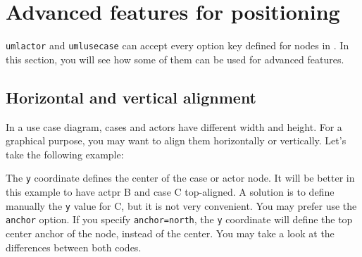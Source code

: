 \documentclass[a4paper,11pt]{report}
\begin{document}
\medskip\section{Advanced features for positioning}\label{s.ucdiagadvfeat}

{\tt umlactor} and {\tt umlusecase} can accept every option key defined for nodes in \TikZ.
In this section, you will see how some of them can be used for advanced features.

\subsection{Horizontal and vertical alignment}\label{ss.ucdiaghvalign}

In a use case diagram, cases and actors have different width and height. For a graphical purpose, you may want to align them horizontally or vertically. Let's take the following example:

\medskip

\begin{minipage}{0.5\textwidth}

\end{minipage}
\begin{minipage}{0.5\textwidth}
\begin{center}
\end{center}
\end{minipage}

\medskip

The {\tt y} coordinate defines the center of the case or actor node. It will be better in this example to have actpr B and case C top-aligned. A solution is to define manually the {\tt y} value for C, but it is not very convenient. You may prefer use the {\tt anchor} option. If you specify {\tt anchor=north}, the {\tt y} coordinate will define the top center anchor of the node, instead of the center. You may take a look at the differences between both codes.

\medskip

\begin{minipage}{0.5\textwidth}

\end{minipage}
\begin{minipage}{0.5\textwidth}
\begin{center}
\end{center}
\end{minipage}

\medskip
\end{document}
